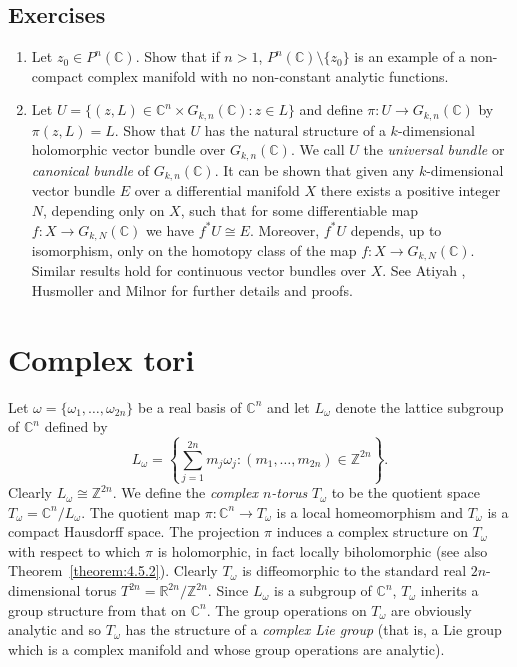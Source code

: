 \subsection*{Exercises}
\begin{enumerate}
\item Let $z_0\in P^n(\mathbb C)$. Show that if $n>1$, $P^n(\mathbb C)\setminus\{z_0\}$ is an example of a non-compact complex manifold with no non-constant analytic functions.
\item Let $U=\{(z,L)\in\mathbb C^n\times G_{k,n}(\mathbb C):z\in L\}$ and define $\pi:U\longrightarrow G_{k,n}(\mathbb C)$ by $\pi(z,L)=L$. Show that $U$ has the natural structure of a $k$-dimensional holomorphic vector bundle over $G_{k,n}(\mathbb C)$. We call $U$ the \emph{universal bundle} or \emph{canonical bundle} of $G_{k,n}(\mathbb C)$. It can be shown that given any $k$-dimensional vector bundle $E$ over a differential manifold $X$ there exists a positive integer $N$, depending only on $X$, such that for some differentiable map $f:X\longrightarrow G_{k,N}(\mathbb C)$ we have $f^*U\cong E$. Moreover, $f^*U$ depends, up to isomorphism, only on the homotopy class of the map $f:X\longrightarrow G_{k,N}(\mathbb C)$. Similar results hold for continuous vector bundles over $X$. See Atiyah \cite{bib:I:atiyah-m:1}, Husmoller \cite{bib:I:husmoller-d:1} and Milnor \cite{bib:I:milnor-j-w:1} for further details and proofs.
\end{enumerate}

\section{Complex tori}\label{sec:4:4}
Let $\omega=\{\omega_1,\ldots,\omega_{2n}\}$ be a real basis of $\mathbb C^n$ and let $L_\omega$ denote the lattice subgroup of $\mathbb C^n$ defined by
\[
L_\omega=\left\{\sum_{j=1}^{2n}m_j\omega_j:(m_1,\ldots,m_{2n})\in\mathbb Z^{2n}\right\}.
\]
Clearly $L_\omega\cong\mathbb Z^{2n}$. We define the \emph{complex $n$-torus} $T_\omega$ to be the quotient space $T_\omega=\mathbb C^n/L_\omega$. The quotient map $\pi:\mathbb C^n\longrightarrow T_\omega$ is a local homeomorphism and $T_\omega$ is a compact Hausdorff space. The projection $\pi$ induces a complex structure on $T_\omega$ with respect to which $\pi$ is holomorphic, in fact locally biholomorphic (see also Theorem~\ref{theorem:4.5.2}). Clearly $T_\omega$ is diffeomorphic to the standard real $2n$-dimensional torus $T^{2n}=\mathbb R^{2n}/\mathbb Z^{2n}$. Since $L_\omega$ is a subgroup of $\mathbb C^n$, $T_\omega$ inherits a group structure from that on $\mathbb C^n$. The group operations on $T_\omega$ are obviously analytic and so $T_\omega$ has the structure of a \emph{complex Lie group} (that is, a Lie group which is a complex manifold and whose group operations are analytic).


